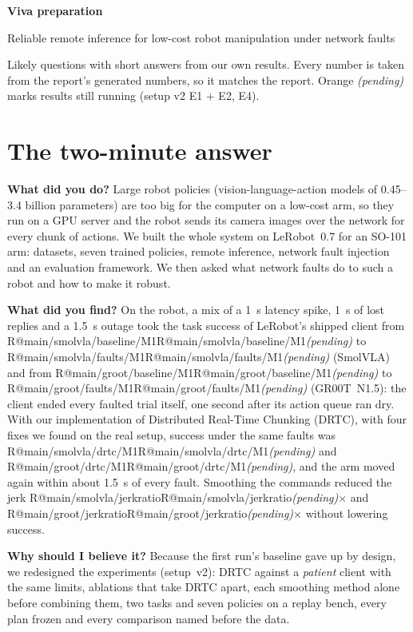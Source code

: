 \documentclass[11pt,a4paper]{article}
\makeatletter
\newcommand{\R}[1]{\ifcsname R@#1\endcsname\csname R@#1\endcsname\else\pending\fi}
\newcommand{\pending}{\textit{\color{warn}(pending)}}
\newcommand{\drtc}{DRTC}
\newcommand{\smolvla}{SmolVLA}
\newcommand{\groot}{GR00T~N1.5}
\makeatother
\begin{document}
{\LARGE\bfseries Viva preparation}\par\smallskip
{\large Reliable remote inference for low-cost robot manipulation under network faults}\par\smallskip
{\color{muted}Likely questions with short answers from our own results. Every number is taken from the report's
generated numbers, so it matches the report. Orange \pending{} marks results still running (setup v2 E1 + E2, E4).}

\tableofcontents

\section{The two-minute answer}

\textbf{What did you do?} Large robot policies (vision-language-action models of 0.45--3.4 billion parameters) are
too big for the computer on a low-cost arm, so they run on a GPU server and the robot sends its camera images over
the network for every chunk of actions. We built the whole system on LeRobot~0.7 for an SO-101 arm: datasets, seven
trained policies, remote inference, network fault injection and an evaluation framework. We then asked what network
faults do to such a robot and how to make it robust.

\textbf{What did you find?} On the robot, a mix of a 1~s latency spike, 1~s of lost replies and a 1.5~s outage took
the task success of LeRobot's shipped client from \R{main/smolvla/baseline/M1} to \R{main/smolvla/faults/M1}
(\smolvla) and from \R{main/groot/baseline/M1} to \R{main/groot/faults/M1} (\groot): the client ended every faulted
trial itself, one second after its action queue ran dry. With our implementation of Distributed Real-Time Chunking
(\drtc), with four fixes we found on the real setup, success under the same faults was \R{main/smolvla/drtc/M1} and
\R{main/groot/drtc/M1}, and the arm moved again within about 1.5~s of every fault. Smoothing the commands reduced the
jerk \R{main/smolvla/jerkratio}$\times$ and \R{main/groot/jerkratio}$\times$ without lowering success.

\textbf{Why should I believe it?} Because the first run's baseline gave up by design, we redesigned the experiments
(setup~v2): \drtc{} against a \emph{patient} client with the same limits, ablations that take \drtc{} apart, each
smoothing method alone before combining them, two tasks and seven policies on a replay bench, every plan frozen and
every comparison named before the data.
\end{document}

